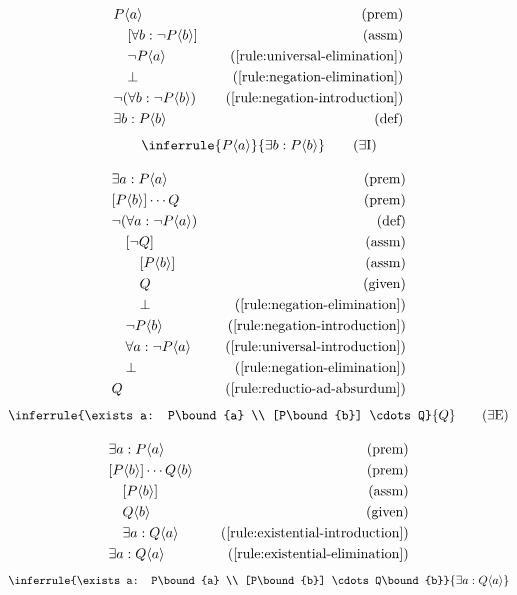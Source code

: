 \begin{align*}
    \premise{P\bound{a}}\\
    \assumption[1]{\forall b: \neg P\bound{b}}\\
    \byrule[1]{\neg P\bound{a}}{\ref{rule:universal-elimination}}\\
    \byrule[1]{\bot}{\ref{rule:negation-elimination}}\\
    \byrule{\neg (\forall b: \neg P\bound{b})}{\ref{rule:negation-introduction}}\\
    \bydefinition{\exists b: P\bound{b}}
\end{align*}
\begin{equation}
    \inferrule{P\bound{a}}{\exists b: P\bound{b}}
    \tag{{$\exists$}I}
    \label{rule:existential-introduction}
\end{equation}

\begin{align*}
    \premise{\exists a: P\bound{a}}\\
    \premise{[P\bound{b}] \cdots Q}\\
    \bydefinition{\neg(\forall a: \neg P\bound{a})}\\
    \assumption[1]{\neg Q}\\
    \assumption[2]{P\bound{b}}\\
    \given[2]{Q}\\
    \byrule[2]{\bot}{\ref{rule:negation-elimination}}\\
    \byrule[1]{\neg P\bound{b}}{\ref{rule:negation-introduction}}\\
    \byrule[1]{\forall a: \neg P\bound{a}}{\ref{rule:universal-introduction}}\\
    \byrule[1]{\bot}{\ref{rule:negation-elimination}}\\
    \byrule{Q}{\ref{rule:reductio-ad-absurdum}}
\end{align*}
\begin{equation}
    \inferrule{\exists a: P\bound{a} \\ [P\bound{b}] \cdots Q}{Q}
    \tag{{$\exists$}E}
    \label{rule:existential-elimination}
\end{equation}

\begin{align*}
    \premise{\exists a: P\bound{a}}\\
    \premise{[P\bound{b}] \cdots Q\bound{b}}\\
    \assumption[1]{P\bound{b}}\\
    \given[1]{Q\bound{b}}\\
    \byrule[1]{\exists a: Q\bound{a}}{\ref{rule:existential-introduction}}\\
    \byrule{\exists a: Q\bound{a}}{\ref{rule:existential-elimination}}
\end{align*}
\begin{equation}
    \inferrule{\exists a: P\bound{a} \\ [P\bound{b}] \cdots Q\bound{b}}{\exists a: Q\bound{a}}
    \label{rule:existential-monotonicity}
\end{equation}

